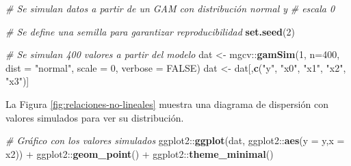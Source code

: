 \documentclass[
  12pt]{article}
\newenvironment{Shaded}{}{}
\newcommand{\CommentTok}[1]{\textcolor[rgb]{0.38,0.63,0.69}{\textit{#1}}}
\newcommand{\DataTypeTok}[1]{\textcolor[rgb]{0.56,0.13,0.00}{#1}}
\newcommand{\DecValTok}[1]{\textcolor[rgb]{0.25,0.63,0.44}{#1}}
\newcommand{\KeywordTok}[1]{\textcolor[rgb]{0.00,0.44,0.13}{\textbf{#1}}}
\newcommand{\NormalTok}[1]{#1}
\newcommand{\OperatorTok}[1]{\textcolor[rgb]{0.40,0.40,0.40}{#1}}
\newcommand{\OtherTok}[1]{\textcolor[rgb]{0.00,0.44,0.13}{#1}}
\newcommand{\StringTok}[1]{\textcolor[rgb]{0.25,0.44,0.63}{#1}}
\begin{document}
\begin{Shaded}
\begin{Highlighting}[]
\CommentTok{# Se simulan datos a partir de un GAM con distribución normal y }
\CommentTok{# escala 0}

\CommentTok{# Se define una semilla para garantizar reproducibilidad}
\KeywordTok{set.seed}\NormalTok{(}\DecValTok{2}\NormalTok{) }

\CommentTok{# Se simulan 400 valores a partir del modelo}
\NormalTok{dat <-}\StringTok{ }\NormalTok{mgcv}\OperatorTok{::}\KeywordTok{gamSim}\NormalTok{(}\DecValTok{1}\NormalTok{, }\DataTypeTok{n=}\DecValTok{400}\NormalTok{, }\DataTypeTok{dist =} \StringTok{"normal"}\NormalTok{, }
                    \DataTypeTok{scale =} \DecValTok{0}\NormalTok{, }\DataTypeTok{verbose =} \OtherTok{FALSE}\NormalTok{)}
\NormalTok{dat <-}\StringTok{ }\NormalTok{dat[,}\KeywordTok{c}\NormalTok{(}\StringTok{"y"}\NormalTok{, }\StringTok{"x0"}\NormalTok{, }\StringTok{"x1"}\NormalTok{, }\StringTok{"x2"}\NormalTok{, }\StringTok{"x3"}\NormalTok{)]}
\end{Highlighting}
\end{Shaded}

La Figura \ref{fig:relaciones-no-lineales} muestra una diagrama de dispersión con valores simulados para ver su distribución.

\begin{Shaded}
\begin{Highlighting}[]
\CommentTok{# Gráfico con los valores simulados}
\NormalTok{ggplot2}\OperatorTok{::}\KeywordTok{ggplot}\NormalTok{(dat, ggplot2}\OperatorTok{::}\KeywordTok{aes}\NormalTok{(}\DataTypeTok{y =}\NormalTok{ y,}\DataTypeTok{x =}\NormalTok{ x2)) }\OperatorTok{+}
\StringTok{  }\NormalTok{ggplot2}\OperatorTok{::}\KeywordTok{geom_point}\NormalTok{() }\OperatorTok{+}
\StringTok{  }\NormalTok{ggplot2}\OperatorTok{::}\KeywordTok{theme_minimal}\NormalTok{()}
\end{Highlighting}
\end{Shaded}
\end{document}

